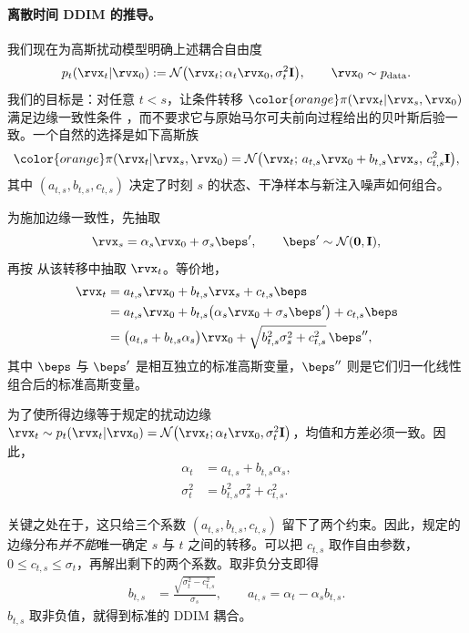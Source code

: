 \paragraph{离散时间 DDIM 的推导。}
我们现在为高斯扰动模型明确上述耦合自由度
\[
p_t(\rvx_t|\rvx_0)
:=
\mathcal{N}
\bigl(
\rvx_t;
\alpha_t\rvx_0,
\sigma_t^2\mathbf{I}
\bigr),
\qquad
\rvx_0\sim p_{\mathrm{data}}.
\]
我们的目标是：对任意 $t<s$，让条件转移 ${\color{orange}\pi(\rvx_t|\rvx_s,\rvx_0)}$ 满足边缘一致性条件 ，而不要求它与原始马尔可夫前向过程给出的贝叶斯后验一致。一个自然的选择是如下高斯族
\begin{align}
\label{eq:ddim-reverse-kernel-param}
{\color{orange}\pi(\rvx_t|\rvx_s,\rvx_0)}
=
\mathcal{N}
\bigl(
\rvx_t;\,
a_{t,s}\rvx_0+b_{t,s}\rvx_s,\,
c_{t,s}^2\mathbf{I}
\bigr),
\end{align}
其中 $(a_{t,s},b_{t,s},c_{t,s})$ 决定了时刻 $s$ 的状态、干净样本与新注入噪声如何组合。

为施加边缘一致性，先抽取
\[
\rvx_s
=
\alpha_s\rvx_0+\sigma_s\beps',
\qquad
\beps'\sim\mathcal{N}(\mathbf{0},\mathbf{I}),
\]
再按  从该转移中抽取 $\rvx_t$。等价地，
\begin{align}
\label{eq:ddim-derivation}
\begin{aligned}
\rvx_t
&=
a_{t,s}\rvx_0
+
b_{t,s}\rvx_s
+
c_{t,s}\beps
\\
&=
a_{t,s}\rvx_0
+
b_{t,s}
\bigl(
\alpha_s\rvx_0+\sigma_s\beps'
\bigr)
+
c_{t,s}\beps
\\
&=
\bigl(
a_{t,s}+b_{t,s}\alpha_s
\bigr)\rvx_0
+
\sqrt{
b_{t,s}^2\sigma_s^2+c_{t,s}^2
}\,
\beps'',
\end{aligned}
\end{align}
其中 $\beps$ 与 $\beps'$ 是相互独立的标准高斯变量，$\beps''$ 则是它们归一化线性组合后的标准高斯变量。

为了使所得边缘等于规定的扰动边缘 $\rvx_t
\sim
p_t(\rvx_t|\rvx_0)
=
\mathcal{N}
\bigl(
\rvx_t;
\alpha_t\rvx_0,
\sigma_t^2\mathbf{I}
\bigr)$，均值和方差必须一致。因此，
\begin{align*}
\alpha_t
&=
a_{t,s}+b_{t,s}\alpha_s,
\\
\sigma_t^2
&=
b_{t,s}^2\sigma_s^2+c_{t,s}^2.
\end{align*}

关键之处在于，这只给三个系数 $(a_{t,s},b_{t,s},c_{t,s})$ 留下了两个约束。因此，规定的边缘分布\emph{并不能}唯一确定 $s$ 与 $t$ 之间的转移。可以把 $c_{t,s}$ 取作自由参数，$0\leq c_{t,s}\leq\sigma_t$，再解出剩下的两个系数。取非负分支即得
\begin{align}
\label{eq:ddim-coefficients}
b_{t,s}
&=
\frac{
\sqrt{\sigma_t^2-c_{t,s}^2}
}{
\sigma_s
},
\qquad
a_{t,s}
=
\alpha_t-\alpha_s b_{t,s}.
\end{align}
$b_{t,s}$ 取非负值，就得到标准的 DDIM 耦合。

